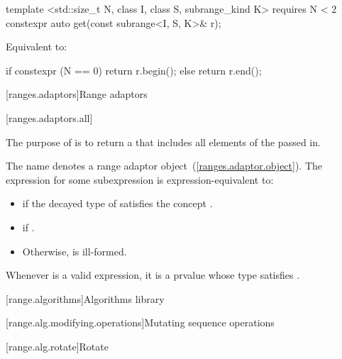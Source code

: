 %
\begin{itemdecl}
template <std::size_t N, class I, class S, subrange_kind K>
  requires N < 2
constexpr auto get(const subrange<I, S, K>& r);
\end{itemdecl}

\begin{itemdescr}
\pnum
\effects Equivalent to:
\begin{codeblock}
if constexpr (N == 0)
  return r.begin();
else
  return r.end();
\end{codeblock}
\end{itemdescr}

[ranges.adaptors]{Range adaptors}

\setcounter{subsection}{3}
[ranges.adaptors.all]{}

\pnum
The purpose of  is to return a  that includes all
elements of the  passed in.

\pnum
The name  denotes a range adaptor
object~(\ref{ranges.adaptor.object}). The
expression  for some subexpression  is
expression-equivalent to:

\begin{itemize}
\item {} if the decayed type of 
satisfies the concept .
\item {} if .
\item Otherwise,  is ill-formed.
\end{itemize}

\remark Whenever  is a valid expression, it is a prvalue
whose type satisfies .

\setcounter{section}{9}
[range.algorithms]{Algorithms library}


\setcounter{subsection}{2}
[range.alg.modifying.operations]{Mutating sequence operations}

\setcounter{subsubsection}{10}
[range.alg.rotate]{Rotate}

